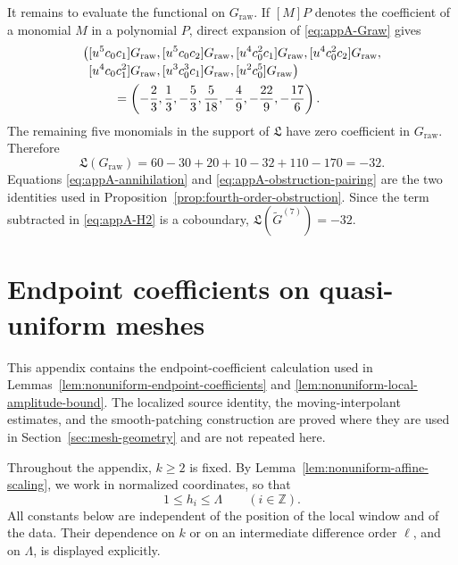 \documentclass[11pt]{amsart}
\theoremstyle{plain}
\theoremstyle{definition}
\theoremstyle{remark}
\numberwithin{equation}{section}
\theoremstyle{plain}
\begin{document}
It remains to evaluate the functional on $G_{\mathrm{raw}}$.  If
$[M]P$ denotes the coefficient of a monomial $M$ in a polynomial $P$, direct
expansion of \eqref{eq:appA-Graw} gives
\begin{align}
\bigl(&[u^5c_0c_1]G_{\mathrm{raw}},
[u^5c_0c_2]G_{\mathrm{raw}},
[u^4c_0^2c_1]G_{\mathrm{raw}},
[u^4c_0^2c_2]G_{\mathrm{raw}},\notag\\[-2pt]
&[u^4c_0c_1^2]G_{\mathrm{raw}},
[u^3c_0^3c_1]G_{\mathrm{raw}},
[u^2c_0^5]G_{\mathrm{raw}}\bigr)\notag\\
&\qquad=
\left(-\frac23,\frac13,-\frac53,\frac5{18},-\frac49,
-\frac{22}{9},-\frac{17}{6}\right).
\label{eq:appA-Graw-coefficients}
\end{align}
The remaining five monomials in the support of $\mathfrak L$ have zero
coefficient in $G_{\mathrm{raw}}$.  Therefore
\begin{equation}\label{eq:appA-obstruction-pairing}
	\mathfrak L(G_{\mathrm{raw}})
	=60-30+20+10-32+110-170=-32.
\end{equation}
Equations \eqref{eq:appA-annihilation} and
\eqref{eq:appA-obstruction-pairing} are the two identities used in
Proposition~\ref{prop:fourth-order-obstruction}.  Since the term subtracted in
\eqref{eq:appA-H2} is a coboundary,
$\mathfrak L(\widetilde G^{(7)})=-32$.


\section{\texorpdfstring{Endpoint coefficients on quasi-uniform meshes}{Endpoint coefficients on quasi-uniform meshes}}
\label{app:quasi-uniform-estimates}

This appendix contains the endpoint-coefficient calculation used in
Lemmas~\ref{lem:nonuniform-endpoint-coefficients} and
\ref{lem:nonuniform-local-amplitude-bound}.  The localized source identity,
the moving-interpolant estimates, and the smooth-patching construction are
proved where they are used in Section~\ref{sec:mesh-geometry} and are not
repeated here.

Throughout the appendix, $k\ge2$ is fixed.  By
Lemma~\ref{lem:nonuniform-affine-scaling}, we work in normalized coordinates,
so that
\begin{equation}\label{eq:app-normalized-mesh}
	1\le h_i\le\Lambda
	\qquad(i\in\mathbb Z).
\end{equation}
All constants below are independent of the position of the local window and
of the data.  Their dependence on $k$ or on an intermediate difference order
$\ell$, and on $\Lambda$, is displayed explicitly.
\end{document}
